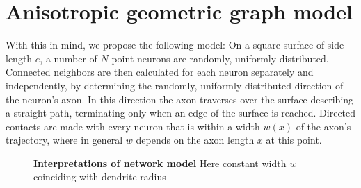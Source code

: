 \section{Anisotropic geometric graph model}\label{sec:network_model}







With this in mind, we propose the following model: On a square surface
of side length $e$, a number of $N$ point neurons are randomly,
uniformly distributed.  Connected neighbors are then calculated for
each neuron separately and independently, by determining the randomly,
uniformly distributed direction of the neuron's axon. In this
direction the axon traverses over the surface describing a straight
path, terminating only when an edge of the surface is
reached. Directed contacts are made with every neuron that is within a
width $w(x)$ of the axon's trajectory, where in general $w$ depends on
the axon length $x$ at this point.


\begin{figure}[!htbp]
  \centering 
  \caption{%
    \textbf{Interpretations of network model}
   Here constant width $w$ coinciding with dendrite radius}
  \label{fig:network_model}
\end{figure}
\vspace{-0.2cm}



